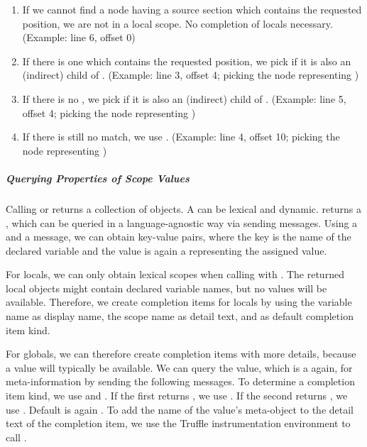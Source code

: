     \begin{enumerate}
        \item If we cannot find a node having a source section which contains the requested position, we are not in a local scope. No completion of locals necessary. (Example: line 6, offset 0)
        \item If there is one which contains the requested position, we pick  if it is also an (indirect) child of . (Example: line 3, offset 4; picking the node representing )
        \item If there is no , we pick  if it is also an (indirect) child of . (Example: line 5, offset 4; picking the node representing )
        \item If there is still no match, we use . (Example: line 4, offset 10; picking the node representing )
    \end{enumerate}

    \subparagraph{Querying Properties of Scope Values}
    Calling  or  returns a collection of  objects. A  can be lexical and dynamic.  returns a , which can be queried in a language-agnostic way via sending messages. Using a  and a  message, we can obtain key-value pairs, where the key is the name of the declared variable and the value is again a  representing the assigned value.

    For locals, we can only obtain lexical scopes when calling  with . The returned local  objects might contain declared variable names, but no values will be available. Therefore, we create completion items for locals by using the variable name as display name, the scope name as detail text, and  as default completion item kind.
    
    For globals, we can therefore create completion items with more details, because a value will typically be available. We can query the value, which is a  again, for meta-information by sending the following messages. To determine a completion item kind, we use  and . If the first returns , we use . If the second returns , we use . Default is again . To add the name of the value's meta-object to the detail text of the completion item, we use the Truffle instrumentation environment to call .

